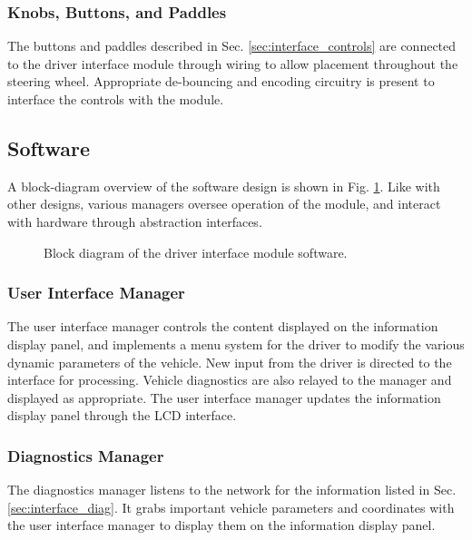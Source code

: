 \subsubsection{Knobs, Buttons, and Paddles}

The buttons and paddles described in Sec. \ref{sec:interface_controls} are connected to the driver interface module through wiring to allow placement throughout the steering wheel. Appropriate de-bouncing and encoding circuitry is present to interface the controls with the module. 

\subsection{Software}

A block-diagram overview of the software design is shown in Fig. \ref{fig:interface_software_design_block}. Like with other designs, various managers oversee operation of the module, and interact with hardware through abstraction interfaces.

\begin{figure}[H]
	\centering
	
	\caption{Block diagram of the driver interface module software.}
	\label{fig:interface_software_design_block}
\end{figure}

\subsubsection{User Interface Manager}

The user interface manager controls the content displayed on the information display panel, and implements a menu system for the driver to modify the various dynamic parameters of the vehicle. New input from the driver is directed to the interface for processing. Vehicle diagnostics are also relayed to the manager and displayed as appropriate. The user interface manager updates the information display panel through the LCD interface.

\subsubsection{Diagnostics Manager}

The diagnostics manager listens to the network for the information listed in Sec. \ref{sec:interface_diag}. It grabs important vehicle parameters and coordinates with the user interface manager to display them on the information display panel.

